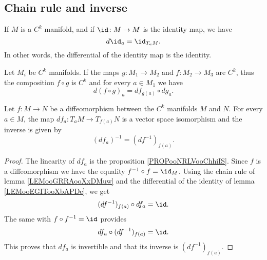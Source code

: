 \subsection{Chain rule and inverse}

\begin{lemma}       \label{LEMooEGITooXbAPDe}
    If \( M\) is a \( C^k\) manifold, and if \( \id\colon M\to M\) is the identity map, we have
    \begin{equation}
        d\id_a=\id_{T_aM}.
    \end{equation}
    In other words, the differential of the identity map is the identity.
\end{lemma}

\begin{lemma}       \label{LEMooGRRAooXxDMuw}
    Let \( M_i\) be \( C^k\) manifolds. If the maps \( g\colon M_1\to M_2\) and \( f\colon M_2\to M_3 \) are \( C^k\), thus the composition \( f\circ g\) is \( C^k\) and for every \( a\in M_1\) we have
    \begin{equation}
        d(f\circ g)_a=df_{g(a)}\circ dg_a.
    \end{equation}
\end{lemma}


\begin{proposition}       \label{PROPooPEMLooPQcywG}
    Let \( f\colon M\to N\) be a diffeomorphism between the \( C^k\) manifolds \( M\) and \( N\). For every \( a\in M\), the map \( df_a\colon T_aM\to T_{f(a)}N\) is a vector space isomorphism and the inverse is given by
    \begin{equation}
        (df_a)^{-1}=(df^{-1})_{f(a)}.
    \end{equation}
\end{proposition}

\begin{proof}
    The linearity of \( df_a\) is the proposition \ref{PROPooNRLVooChhiIS}. Since \( f\) is a diffeomorphism we have the equality \( f^{-1}\circ f=\id_M\). Using the chain rule of lemma \ref{LEMooGRRAooXxDMuw} and the differential of the identity of lemma \ref{LEMooEGITooXbAPDe}, we get
    \begin{equation}
        (df^{-1})_{f(a)}\circ df_a=\id.
    \end{equation}
    The same with \( f\circ f^{-1}=\id\) provides
    \begin{equation}
        df_a\circ(df^{-1})_{f(a)}=\id.
    \end{equation}
    This proves that \( df_a\) is invertible and that its inverse is \( (df^{-1})_{f(a)}\).
\end{proof}

